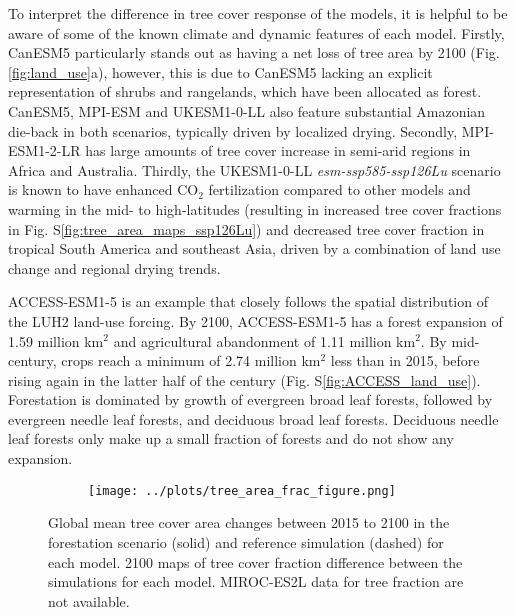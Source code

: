 \documentclass[]{article}
\begin{document}
To interpret the difference in tree cover response of the models, it is helpful to be aware of some of the known climate and dynamic features of each model.
Firstly, CanESM5 particularly stands out as having a net loss of tree area by 2100 (Fig. \ref{fig:land_use}a), however, this is due to CanESM5 lacking an explicit representation of shrubs and rangelands, which have been allocated as forest.
CanESM5, MPI-ESM and UKESM1-0-LL also feature substantial Amazonian die-back in both scenarios, typically driven by localized drying.
Secondly, MPI-ESM1-2-LR has large amounts of tree cover increase in semi-arid regions in Africa and Australia.
Thirdly, the UKESM1-0-LL \textit{esm-ssp585-ssp126Lu} scenario is known to have enhanced CO$_2$ fertilization compared to other models and warming in the mid- to high-latitudes (resulting in increased tree cover fractions in Fig. S\ref{fig:tree_area_maps_ssp126Lu}) and decreased tree cover fraction in tropical South America and southeast Asia, driven by a combination of land use change and regional drying trends.

ACCESS-ESM1-5 is an example that closely follows the spatial distribution of the LUH2 land-use forcing.
By 2100, ACCESS-ESM1-5 has a forest expansion of 1.59 million km$^2$ and agricultural abandonment of 1.11 million km$^2$.
By mid-century, crops reach a minimum of 2.74 million km$^2$ less than in 2015, before rising again in the latter half of the century (Fig. S\ref{fig:ACCESS_land_use}).
Forestation is dominated by growth of evergreen broad leaf forests, followed by evergreen needle leaf forests, and deciduous broad leaf forests.
Deciduous needle leaf forests only make up a small fraction of forests and do not show any expansion.

\begin{figure}[H]
    \centering
    \begin{subfigure}[b]{0.8\linewidth}
        \texttt{[image: ../plots/tree\_area\_frac\_figure.png]}
    \end{subfigure}
    \caption{Global mean tree cover area changes between 2015 to 2100 in the forestation scenario (solid) and reference simulation (dashed) for each model. 2100 maps of tree cover fraction difference between the simulations for each model. MIROC-ES2L data for tree fraction are not available.}
    \label{fig:land_use_map}
\end{figure}
\end{document}
